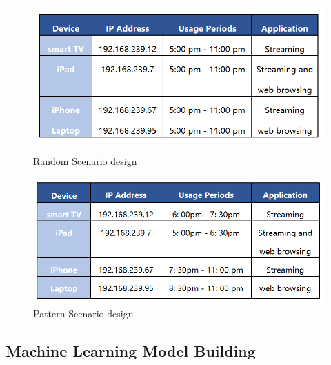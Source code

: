 \documentclass[10pt]{article}
\begin{document}
\begin{figure}[H]
    \centering
    \begin{minipage}{0.48\linewidth}
        \includegraphics[width=\linewidth]{Random Scenario design.png}
        \caption{Random Scenario design}
        \label{fig:random-scenario}
    \end{minipage}\hfill
    \begin{minipage}{0.48\linewidth}
        \includegraphics[width=\linewidth]{Pattern Scenario design.png}
        \caption{Pattern Scenario design}
        \label{fig:pattern-scenario}
    \end{minipage}
\end{figure}


\subsection{Machine Learning Model Building}
\end{document}
